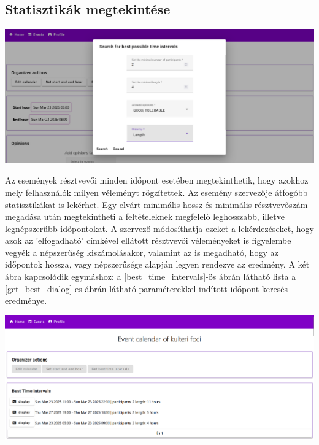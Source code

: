 \documentclass[a4paper,12pt]{report}
\theoremstyle{definition}
\theoremstyle{remark}
\begin{document}
	\subsection{Statisztikák megtekintése}

\begin{center}
\includegraphics[width=150mm]{get_best_dialog}
\captionsetup{width=0.8\linewidth}
\label{get_best_dialog}
\end{center}

Az események résztvevői minden időpont esetében megtekinthetik, hogy azokhoz mely felhasználók milyen véleményt rögzítettek. Az esemény szervezője átfogóbb statisztikákat is lekérhet. Egy elvárt minimális hossz és minimális résztvevőszám megadása után megtekintheti a feltételeknek megfelelő leghosszabb, illetve legnépszerűbb időpontokat. A szervező módosíthatja ezeket a lekérdezéseket, hogy azok az 'elfogadható' címkével ellátott résztvevői véleményeket is figyelembe vegyék a népszerűség kiszámolásakor, valamint az is megadható, hogy az időpontok hossza, vagy népszerűsége alapján legyen rendezve az eredmény. A két ábra kapcsolódik egymáshoz: a \ref{best_time_intervals}-ös ábrán látható lista a \ref{get_best_dialog}-es ábrán látható paraméterekkel indított időpont-keresés eredménye.

\begin{center}
\includegraphics[width=150mm]{best_time_intervals}
\captionsetup{width=0.8\linewidth}
\label{best_time_intervals}
\end{center}
\end{document}
